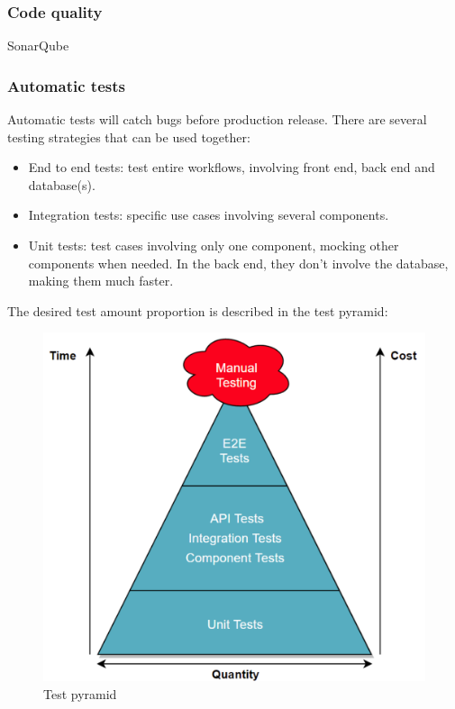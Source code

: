 \documentclass[11pt,spanish]{article} %
\begin{document}
\subsubsection{Code quality}
SonarQube

\subsubsection{Automatic tests}
Automatic tests will catch bugs before production release.
There are several testing strategies that can be used together:
\begin{itemize}
	\item End to end tests: test entire workflows, involving front end, back end and database(s).
	\item Integration tests: specific use cases involving several components.
	\item Unit tests: test cases involving only one component, mocking other components when needed. In the back end, they don't involve the database, making them much faster.
\end{itemize}

The desired test amount proportion is described in the test pyramid:
\begin{figure}[H]
  \centering
  \includegraphics[scale=0.275]{img/test_pyramid.png}
  \caption{Test pyramid \cite{test-pyramid}}
\end{figure}
\end{document}
